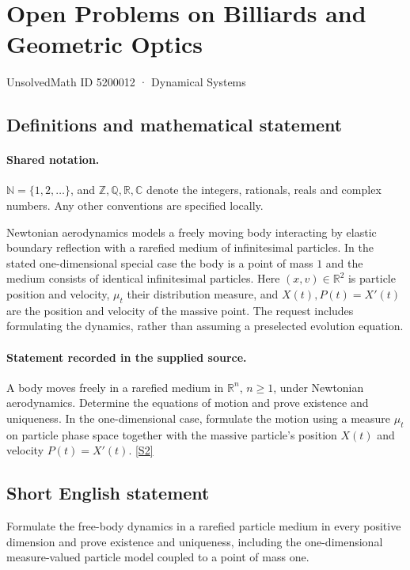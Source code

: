 \documentclass[11pt]{article}
\newcommand{\sref}[2]{\hyperlink{source:#1:#2}{[S#2]}}
\begin{document}
\setcounter{section}{5200011}
\section{Open Problems on Billiards and Geometric Optics}\label{5200012}
{\small\sffamily UnsolvedMath ID 5200012 · Dynamical Systems}
\subsection{Definitions and mathematical statement}

\paragraph{Shared notation.}$\mathbb N=\{1,2,\ldots\}$, and $\mathbb Z,\mathbb Q,\mathbb R,\mathbb C$ denote the integers, rationals, reals and complex numbers. Any other conventions are specified locally.


Newtonian aerodynamics models a freely moving body interacting by elastic boundary reflection with a rarefied medium of infinitesimal particles. In the stated one-dimensional special case the body is a point of mass $1$ and the medium consists of identical infinitesimal particles. Here $(x,v)\in\mathbb R^2$ is particle position and velocity, $\mu_t$ their distribution measure, and $X(t),P(t)=X\prime(t)$ are the position and velocity of the massive point. The request includes formulating the dynamics, rather than assuming a preselected evolution equation.
\paragraph{Statement recorded in the supplied source.}
A body moves freely in a rarefied medium in $\mathbb{R}^n$, $n\geq1$, under Newtonian aerodynamics. Determine the equations of motion and prove existence and uniqueness. In the one-dimensional case, formulate the motion using a measure $\mu_t$ on particle phase space together with the massive particle's position $X(t)$ and velocity $P(t)=X'(t)$. \sref{5200012}{2}
\subsection{Short English statement}
Formulate the free-body dynamics in a rarefied particle medium in every positive dimension and prove existence and uniqueness, including the one-dimensional measure-valued particle model coupled to a point of mass one.
\end{document}
